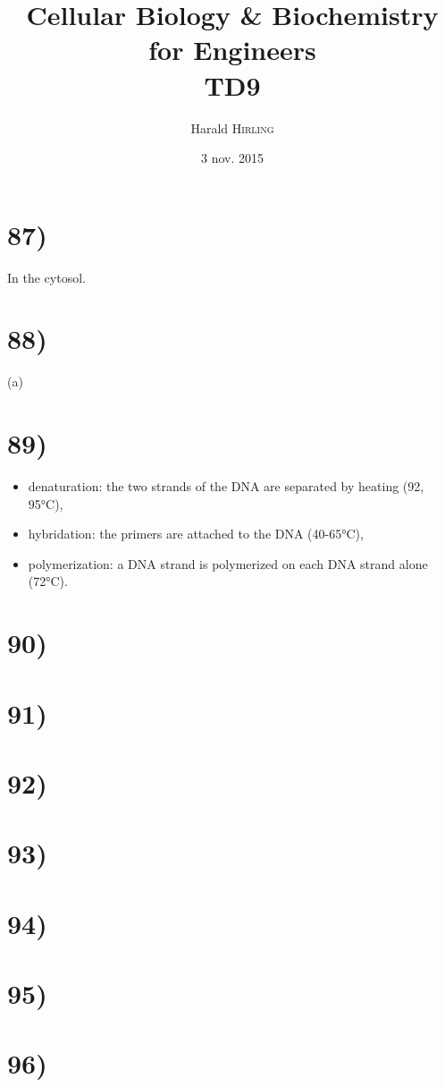 

\title{Cellular Biology \& Biochemistry for Engineers\\TD9}
\author{Harald \textsc{Hirling}}
\date{3 nov. 2015}


\maketitle

\section*{87)}
In the cytosol.

\section*{88)}
(a)

\section*{89)}
\begin{itemize}
    \item denaturation: the two strands of the DNA are separated by heating (92, 95°C),
    \item hybridation: the primers are attached to the DNA (40-65°C),
    \item polymerization: a DNA strand is polymerized on each DNA strand alone (72°C).
\end{itemize}

\section*{90)}
\section*{91)}
\section*{92)}
\section*{93)}
\section*{94)}
\section*{95)}
\section*{96)}

